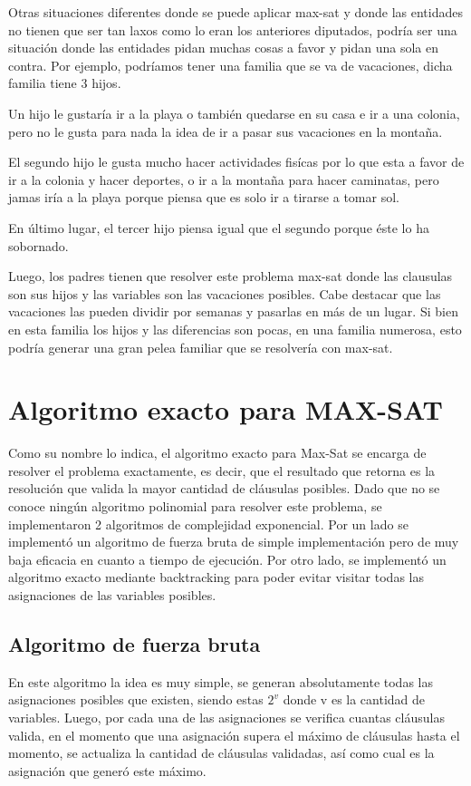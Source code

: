 \documentclass[a4paper,10pt]{article}
\begin{document}
Otras situaciones diferentes donde se puede aplicar max-sat y donde las entidades no tienen que ser tan laxos como lo eran los anteriores diputados, podr\'ia ser una situaci\'on donde las entidades pidan muchas cosas a favor y pidan una sola en contra. Por ejemplo, podr\'iamos tener una familia que se va de vacaciones, dicha familia tiene 3 hijos. 

Un hijo le gustar\'ia ir a la playa o tambi\'en quedarse en su casa e ir a una colonia, pero no le gusta para nada la idea de ir a pasar sus vacaciones en la monta\~{n}a.

El segundo hijo le gusta mucho hacer actividades fis\'icas por lo que esta a favor de ir a la colonia y hacer deportes, o ir a la monta\~{n}a para hacer caminatas, pero jamas ir\'ia a la playa porque piensa que es solo ir a tirarse a tomar sol. 

En \'ultimo lugar, el tercer hijo piensa igual que el segundo porque \'este lo ha sobornado.

Luego, los padres tienen que resolver este problema max-sat donde las clausulas son sus hijos y las variables son las vacaciones posibles. Cabe destacar que las vacaciones las pueden dividir por semanas y pasarlas en m\'as de un lugar. Si bien en esta familia los hijos y las diferencias son pocas, en una familia numerosa, esto podr\'ia generar una gran pelea familiar que se resolver\'ia con max-sat.


\section*{Algoritmo exacto para MAX-SAT}
Como su nombre lo indica, el algoritmo exacto para Max-Sat se encarga de resolver el problema exactamente, es decir, que el resultado que retorna es la resoluci\'on que valida la mayor cantidad de cl\'ausulas posibles. Dado que no se conoce ning\'un algoritmo polinomial para resolver este problema, se implementaron 2 algoritmos de complejidad exponencial. Por un lado se implement\'o un algoritmo de fuerza bruta de simple implementaci\'on pero de muy baja eficacia en cuanto a tiempo de ejecuci\'on. Por otro lado, se implement\'o un algoritmo exacto mediante backtracking para poder evitar visitar todas las asignaciones de las variables posibles.

\subsection*{Algoritmo de fuerza bruta}
En este algoritmo la idea es muy simple, se generan absolutamente todas las asignaciones posibles que existen, siendo estas $2^{v}$ donde v es la cantidad de variables. Luego, por cada una de las asignaciones se verifica cuantas cl\'ausulas valida, en el momento que una asignaci\'on supera el m\'aximo de cl\'ausulas hasta el momento, se actualiza la cantidad de cl\'ausulas validadas, as\'i como cual es la asignaci\'on que gener\'o este m\'aximo.
\end{document}
